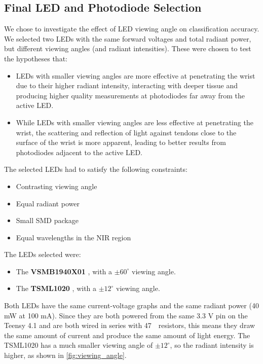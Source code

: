 \documentclass[ oneside,%
                    author={Jack Jarvis},
                    degree={BSc},
                     title={FlexIR: Flexible PCB Wristbands for Infrared Based Gesture Recognition},
                    unit={COMS30045},
                    subtitle={Investigating the Effect of LED Viewing Angle on Gesture Classification in Infrared Sensing Systems}]{dissertation}
\begin{document}
\subsection{Final LED and Photodiode Selection}
We chose to investigate the effect of LED viewing angle on classification accuracy. We selected two LEDs with the same forward voltages and total radiant power, but different viewing angles (and radiant intensities). These were chosen to test the hypotheses that:
\begin{itemize}
    \item LEDs with smaller viewing angles are more effective at penetrating the wrist due to their higher radiant intensity, interacting with deeper tissue and producing higher quality measurements at photodiodes far away from the active LED.
    \item While LEDs with smaller viewing angles are less effective at penetrating the wrist, the scattering and reflection of light against tendons close to the surface of the wrist is more apparent, leading to better results from photodiodes adjacent to the active LED.
\end{itemize}

The selected LEDs had to satisfy the following constraints:

\begin{itemize}
    \item Contrasting viewing angle
    \item Equal radiant power
    \item Small SMD package
    \item Equal wavelengths in the NIR region
\end{itemize}

The LEDs selected were:
\begin{itemize}
    \item The \textbf{VSMB1940X01} \cite{VishaySemiconductors2023VSMB1940X01Nm}, with a $\pm 60^\circ$ viewing angle.
    \item The \textbf{TSML1020} \cite{VishaySemiconductors2017TSML1020Nm}, with a $\pm 12^\circ$ viewing angle.
\end{itemize}

Both LEDs have the same current-voltage graphs and the same radiant power (40 mW at 100 mA). Since they are both powered from the same 3.3 V pin on the Teensy 4.1 and are both wired in series with 47~\ohm\ resistors, this means they draw the same amount of current and produce the same amount of light energy. The TSML1020 has a much smaller viewing angle of $\pm 12^\circ$, so the radiant intensity is higher, as shown in \cref{fig:viewing_angle}.
\end{document}
